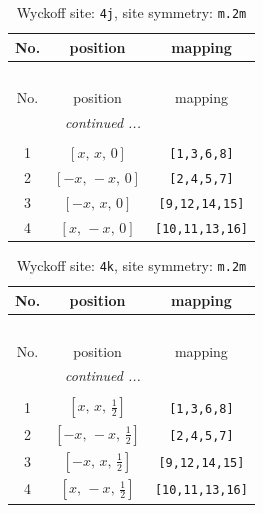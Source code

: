 \documentclass[fleqn,8pt]{jsarticle}
\begin{document}
\begin{longtable}{ccc}
\caption{Wyckoff site: {\tt 4j}, site symmetry: {\tt m.2m}}
 \\
 \hline \hline
No. & position & mapping \\ \hline \endfirsthead

\multicolumn{2}{l}{\tablename\ \thetable{}} \\
 \hline \hline
No. & position & mapping \\ \hline \endhead

 \hline \hline
\multicolumn{2}{r}{\footnotesize\it continued ...} \\ \endfoot

 \hline \hline
\multicolumn{2}{r}{} \\ \endlastfoot

1 & $\left[ x,\, x,\, 0 \right]$ & {\tt [1,3,6,8]} \\ \hline
2 & $\left[ - x,\, - x,\, 0 \right]$ & {\tt [2,4,5,7]} \\ \hline
3 & $\left[ - x,\, x,\, 0 \right]$ & {\tt [9,12,14,15]} \\ \hline
4 & $\left[ x,\, - x,\, 0 \right]$ & {\tt [10,11,13,16]} \\
\end{longtable}
\renewcommand{\arraystretch}{1.2}
\begin{longtable}{ccc}
\caption{Wyckoff site: {\tt 4k}, site symmetry: {\tt m.2m}}
 \\
 \hline \hline
No. & position & mapping \\ \hline \endfirsthead

\multicolumn{2}{l}{\tablename\ \thetable{}} \\
 \hline \hline
No. & position & mapping \\ \hline \endhead

 \hline \hline
\multicolumn{2}{r}{\footnotesize\it continued ...} \\ \endfoot

 \hline \hline
\multicolumn{2}{r}{} \\ \endlastfoot

1 & $\left[ x,\, x,\, \frac{1}{2} \right]$ & {\tt [1,3,6,8]} \\ \hline
2 & $\left[ - x,\, - x,\, \frac{1}{2} \right]$ & {\tt [2,4,5,7]} \\ \hline
3 & $\left[ - x,\, x,\, \frac{1}{2} \right]$ & {\tt [9,12,14,15]} \\ \hline
4 & $\left[ x,\, - x,\, \frac{1}{2} \right]$ & {\tt [10,11,13,16]} \\
\end{longtable}
\end{document}
